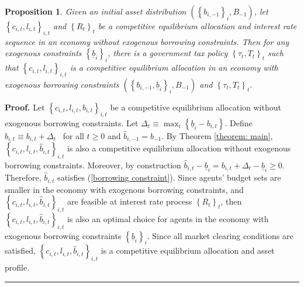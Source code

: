 \documentclass[thmsb,11pt]{article}
\newtheorem{proposition}{Proposition}
\newenvironment{proof}[1][Proof]{\noindent \textbf{#1.} }{\  \rule{0.5em}{0.5em}}
\begin{document}
\begin{proposition}
\label{thm:borrowing_constraint}  Given an initial asset distribution $\left(
\left\{ b_{i,-1}\right\} _{i},B_{-1}\right)$, let $\left\{ c_{i,t},l_{i,t}\right\} _{i,t}$ and $\left\{ R_{t}\right\}_t $ be a competitive
equilibrium allocation and interest rate sequence in an economy without
exogenous borrowing constraints. Then for any exogenous
constraints $\left\{ \underline{b}_{i}\right\} _{i}$, there is a government
tax policy $\left\{ \tau _{t},T_{t}\right\} _{t}$ such that $\left\{
c_{i,t},l_{i,t}\right\} _{i,t}$ is a competitive equilibrium
allocation in an economy with exogenous borrowing constraints $\left(
\left\{ b_{i,-1},\underline{b}_{i}\right\} _{i},B_{-1}\right) $ and $\left\{
\tau _{t},T_{t}\right\} _{t}.$
\end{proposition}

\begin{proof}
Let $\left\{ c_{i,t},l_{i,t},b_{i,t}\right\} _{i,t}$
be a competitive equilibrium allocation without exogenous borrowing
constraints. Let $\Delta _{t}\equiv \max_{i}\left\{ \underline{b}%
_{i}-b_{i,t}\right\} .$ Define $\hat{b}_{i,t}\equiv b_{i,t}+\Delta _{t}$ \ for all $t\geq 0$ and $\hat{b}_{i,-1}=b_{-1}.$ By Theorem %
\ref{theorem: main}, $\left\{ c_{i,t},l_{i,t},\hat{b}%
_{i,t}\right\} _{i,t}$ is also a competitive equilibrium allocation without
exogenous borrowing constraints. Moreover, by construction $\hat{b}_{i,t}-%
\underline{b}_{i}=b_{i,t}+\Delta _{t}-\underline{b}_{i}\geq 0$.
Therefore, $\hat{b}_{i,t}$ satisfies (\ref{borrowing constraint}). Since
agents' budget sets are smaller in the economy with exogenous borrowing
constraints, and $\left\{ c_{i,t},l_{i,t},\hat{b}%
_{i,t}\right\} _{i,t}$ are feasible at interest rate process $\left\{
R_{t}\right\} _{t}$, then $\left\{ c_{i,t},l_{i,t},%
\hat{b}_{i,t}\right\} _{i,t}$ is also an optimal choice for agents in the
economy with exogenous borrowing constraints $\left\{ \underline{b}%
_{i}\right\} _{i}.$ Since all market clearing conditions are satisfied, $%
\left\{ c_{i,t},l_{i,t},\hat{b}_{i,t}\right\} _{i,t}$ is a
competitive equilibrium allocation and asset profile.
\end{proof}
\end{document}
